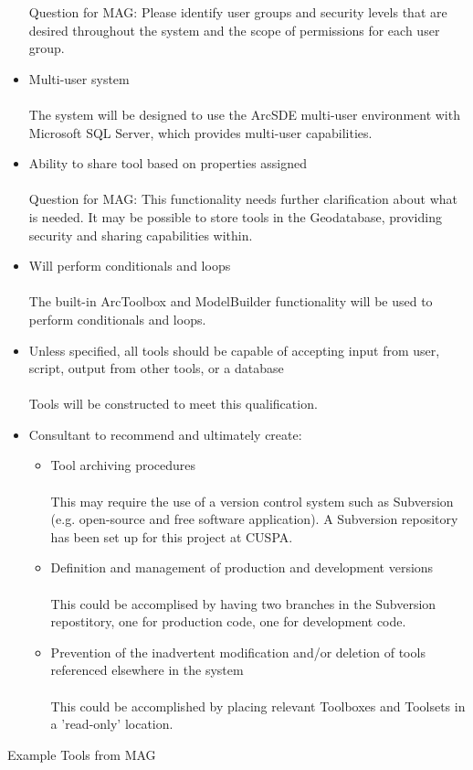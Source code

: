 \documentclass[titlepage]{article}
\begin{document}
\begin{itemize}
	Question for MAG: Please identify user groups and security levels that are desired throughout the system and the scope of permissions for each user group.
	\item Multi-user system
	\\\\
	The system will be designed to use the ArcSDE multi-user environment with Microsoft SQL Server, which provides multi-user capabilities.
	\item Ability to share tool based on properties assigned
	\\\\
	Question for MAG: This functionality needs further clarification about what is needed.  It may be possible to store tools in the Geodatabase, providing security and sharing capabilities within.
	\item Will perform conditionals and loops
	\\\\
	The built-in ArcToolbox and ModelBuilder functionality will be used to perform conditionals and loops.
	\item Unless specified, all tools should be capable of accepting input from user, script, output from other tools, or a database
	\\\\
	Tools will be constructed to meet this qualification.
	\item Consultant to recommend and ultimately create:
		\begin{itemize}
			\item Tool archiving procedures
			\\\\
			This may require the use of a version control system such as Subversion (e.g. open-source and free software application).  A Subversion repository has been set up for this project at CUSPA.
			\item Definition and management of production and development versions
			\\\\
			This could be accomplised by having two branches in the Subversion repostitory, one for production code, one for development code.
			\item Prevention of the inadvertent modification and/or deletion of tools referenced elsewhere in the system
			\\\\
			This could be accomplished by placing relevant Toolboxes and Toolsets in a 'read-only' location.
		\end{itemize}
\end{itemize}
Example Tools from MAG
\end{document}

